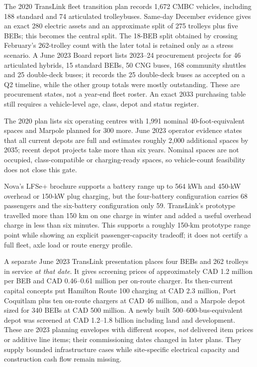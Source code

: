 \documentclass[12pt,letterpaper]{article}
\begin{document}
The 2020 TransLink fleet transition plan records 1,672 CMBC vehicles, including 188 standard and 74 articulated trolleybuses.\cite{fleet2020} Same-day December evidence gives an exact 280 electric assets and an approximate split of 275 trolleys plus five BEBs; this becomes the central split. The 18-BEB split obtained by crossing February's 262-trolley count with the later total is retained only as a stress scenario.\cite{notice,noticeDec,buzzerDec} A June 2023 Board report lists 2023--24 procurement projects for 46 articulated hybrids, 15 standard BEBs, 50 CNG buses, 168 community shuttles and 25 double-deck buses; it records the 25 double-deck buses as accepted on a Q2 timeline, while the other group totals were mostly outstanding. These are procurement states, not a year-end fleet roster.\cite{board2023} An exact 2033 purchasing table still requires a vehicle-level age, class, depot and status register.

The 2020 plan lists six operating centres with 1,991 nominal 40-foot-equivalent spaces and Marpole planned for 300 more. June 2023 operator evidence states that all current depots are full and estimates roughly 2,000 additional spaces by 2035; recent depot projects take more than six years. Nominal spaces are not occupied, class-compatible or charging-ready spaces, so vehicle-count feasibility does not close this gate.\cite{fleet2020,june2023tech}

Nova's LFSe+ brochure supports a battery range up to 564 kWh and 450-kW overhead or 150-kW plug charging, but the four-battery configuration carries 68 passengers and the six-battery configuration only 59. TransLink's prototype travelled more than 150 km on one charge in winter and added a useful overhead charge in less than six minutes. This supports a roughly 150-km prototype range point while showing an explicit passenger-capacity tradeoff; it does not certify a full fleet, axle load or route energy profile.\cite{nova2021,translinkwinter2022}

A separate June 2023 TransLink presentation places four BEBs and 262 trolleys in service \emph{at that date}. It gives screening prices of approximately CAD 1.2 million per BEB and CAD 0.46--0.61 million per on-route charger. Its then-current capital concepts put Hamilton Route 100 charging at CAD 2.3 million, Port Coquitlam plus ten on-route chargers at CAD 46 million, and a Marpole depot sized for 340 BEBs at CAD 500 million. A newly built 500--600-bus-equivalent depot was screened at CAD 1.2--1.8 billion including land and development. These are 2023 planning envelopes with different scopes, \emph{not} delivered item prices or additive line items; their commissioning dates changed in later plans. They supply bounded infrastructure cases while site-specific electrical capacity and construction cash flow remain missing.\cite{june2023tech,playbook2024}
\end{document}
